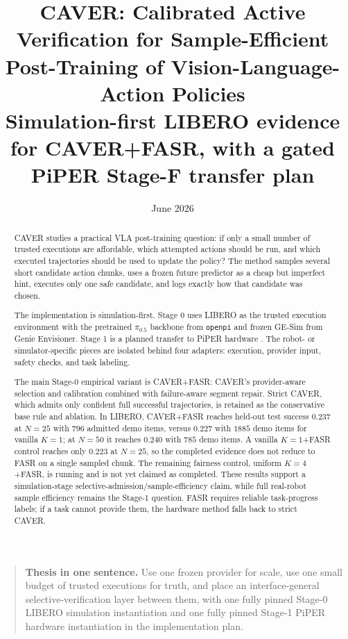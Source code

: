 \documentclass[10pt]{article}
\title{\textbf{CAVER: Calibrated Active Verification for Sample-Efficient Post-Training of Vision-Language-Action Policies}\\[0.35em]
\large Simulation-first LIBERO evidence for CAVER+FASR, with a gated PiPER Stage-F transfer plan}
\author{}
\date{June 2026}
\theoremstyle{plain}
\theoremstyle{definition}
\theoremstyle{remark}
\begin{document}
\maketitle

\begin{abstract}
CAVER studies a practical VLA post-training question: if only a small number of trusted executions are affordable, which attempted actions should be run, and which executed trajectories should be used to update the policy? The method samples several short candidate action chunks, uses a frozen future predictor as a cheap but imperfect hint, executes only one safe candidate, and logs exactly how that candidate was chosen.

The implementation is simulation-first. Stage 0 uses LIBERO as the trusted execution environment with the pretrained $\pi_{0.5}$ backbone from \texttt{openpi} and frozen GE-Sim from Genie Envisioner. Stage 1 is a planned transfer to PiPER hardware \citep{liao2025genie,genierepo2026}. The robot- or simulator-specific pieces are isolated behind four adapters: execution, provider input, safety checks, and task labeling.

The main Stage-0 empirical variant is CAVER+FASR: CAVER's provider-aware selection and calibration combined with failure-aware segment repair. Strict CAVER, which admits only confident full successful trajectories, is retained as the conservative base rule and ablation. In LIBERO, CAVER+FASR reaches held-out test success $0.237$ at $N=25$ with $796$ admitted demo items, versus $0.227$ with $1885$ demo items for vanilla $K=1$; at $N=50$ it reaches $0.240$ with $785$ demo items. A vanilla $K=1$+FASR control reaches only $0.223$ at $N=25$, so the completed evidence does not reduce to FASR on a single sampled chunk. The remaining fairness control, uniform $K=4$+FASR, is running and is not yet claimed as completed. These results support a simulation-stage selective-admission/sample-efficiency claim, while full real-robot sample efficiency remains the Stage-1 question. FASR requires reliable task-progress labels; if a task cannot provide them, the hardware method falls back to strict CAVER.
\end{abstract}


\begin{quote}
\textbf{Thesis in one sentence.} Use one frozen provider for scale, use one small budget of trusted executions for truth, and place an interface-general selective-verification layer between them, with one fully pinned Stage-0 LIBERO simulation instantiation and one fully pinned Stage-1 PiPER hardware instantiation in the implementation plan.
\end{quote}
\end{document}

